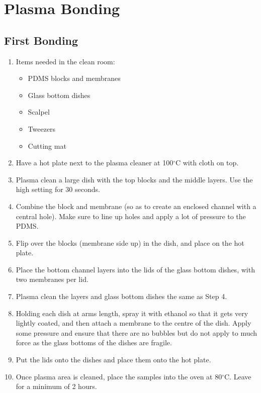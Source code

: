 \section{Plasma Bonding}

\subsection{First Bonding}

\begin{enumerate}
			 \setlength\itemsep{-0.1em}
	\item Items needed in the clean room: \begin{itemize}
			 \setlength\itemsep{-0.1em}
		\item PDMS blocks and membranes
		\item Glass bottom dishes
		\item Scalpel
		\item Tweezers
		\item Cutting mat
	\end{itemize}
	\item Have a hot plate next to the plasma cleaner at 100$^{\circ}$C with cloth on top.
	\item Plasma clean a large dish with the top blocks and the middle layers. Use the high setting for 30 seconds.
	\item Combine the block and membrane (so as to create an enclosed channel with a central hole). Make sure to line up holes and apply a lot of pressure to the PDMS.
	\item Flip over the blocks (membrane side up) in the dish, and place on the hot plate.
	\item Place the bottom channel layers into the lids of the glass bottom dishes, with two membranes per lid.
	\item Plasma clean the layers and glass bottom dishes the same as Step 4.
	\item Holding each dish at arms length, spray it with ethanol so that it gets very lightly coated, and then attach a membrane to the centre of the dish. Apply some pressure and ensure that there are no bubbles but do not apply to much force as the glass bottoms of the dishes are fragile. 
	\item Put the lids onto the dishes and place them onto the hot plate.
	\item Once plasma area is cleaned, place the samples into the oven at 80$^{\circ}$C. Leave for a minimum of 2 hours.
\end{enumerate}

